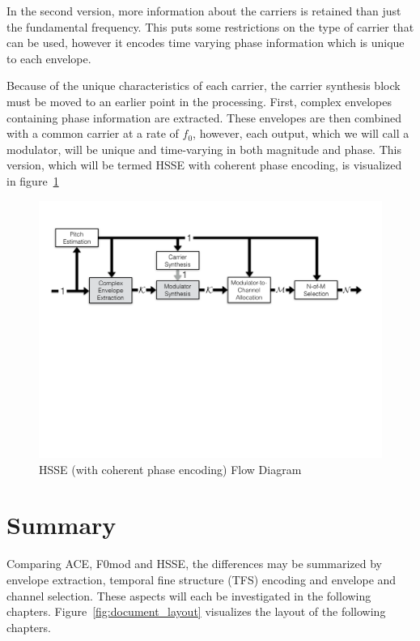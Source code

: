 \documentclass [11pt, proquest,oneside] {ganter_thesis}[2015/03/03]
\begin{document}
In the second version, more information about the carriers is retained than just the fundamental frequency.  This puts some restrictions on the type of carrier that can be used, however it encodes time varying phase information which is unique to each envelope.

Because of the unique characteristics of each carrier, the carrier synthesis block must be moved to an earlier point in the processing.  First, complex envelopes containing phase information are extracted.  These envelopes are then combined with a common carrier at a rate of $f_0$, however, each output, which we will call a modulator, will be unique and time-varying in both magnitude and phase.  This version, which will be termed HSSE with coherent phase encoding, is visualized in figure~\ref{fig:HSSE_flow_2}

\begin{figure}[!ht]
  \centering
    \includegraphics[width=1\textwidth]{HSSE_flow_diagram_Phase}   
    \caption{HSSE (with coherent phase encoding) Flow Diagram}\label{fig:HSSE_flow_2}
\end{figure}

\section{Summary}

Comparing ACE, F0mod and HSSE, the differences may be summarized by envelope extraction, temporal fine structure (TFS) encoding and envelope and channel selection.  These aspects will each be investigated in the following chapters.  Figure~\ref{fig:document_layout} visualizes the layout of the following chapters.
\end{document}
